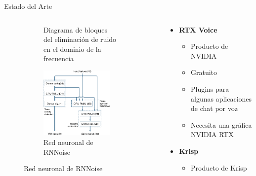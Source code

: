 \begin{frame}[t]{Estado del Arte}
\begin{columns}
\begin{column}{0.6\textwidth}
\begin{figure}[ht!]
\begin{subfigure}[t]{0.45\textwidth}
					\caption{Diagrama de bloques del eliminación de ruido en el dominio de la frecuencia}
					\label{fig: rnn_block_diagram}
				\end{subfigure}
				\begin{subfigure}[b]{0.65\textwidth}
					\centering
					\includegraphics[width=0.9\textwidth]{../figures/rnn_nn.pdf}
					\caption{Red neuronal de RNNoise}
					\label{fig: rnn_nn}
				\end{subfigure}
			\end{figure}
		\end{column}
		\vrule{}
		\begin{column}[t]{0.4\textwidth}
			\vspace*{-100pt}
			\begin{itemize}
				\item \textbf{RTX Voice}
				\begin{itemize}
					\scriptsize
					\item Producto de NVIDIA
					\item {}Gratuito
					\item {}Plugins para algunas aplicaciones de chat por voz
					\item {}Necesita una gráfica NVIDIA RTX
				\end{itemize}
				\item \textbf{Krisp}
				\begin{itemize}
					\scriptsize
					\item Producto de Krisp

\end{itemize}
\end{itemize}
\end{column}
\end{columns}
\end{frame}
